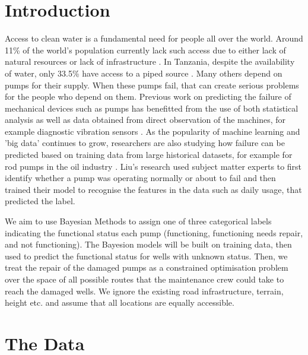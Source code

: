 \documentclass{article} %
\begin{document}
\begin{multicols}{2}

\section{Introduction}

Access to clean water is a fundamental need for people all over the world. Around 11\% of the world's population currently lack such access due to either lack of natural resources or lack of infrastructure \cite{UN2013}. In Tanzania, despite the availability of water, only 33.5\% have access to a piped source \cite{Morisset2012}. Many others depend on pumps for their supply. When these pumps fail, that can create serious problems for the people who depend on them. Previous work on predicting the failure of mechanical devices such as pumps has benefitted from the use of both statistical analysis as well as data obtained from direct observation of the machines, for example diagnostic vibration sensors \cite{Nakamura2007}. As the popularity of machine learning and 'big data' continues to grow, researchers are also studying how failure can be predicted based on training data from large historical datasets, for example for rod pumps in the oil industry \cite{Liu2013}. Liu's research used subject matter experts to first identify whether a pump was operating normally or about to fail and then trained their model to recognise the features in the data such as daily usage, that predicted the label. 

We aim to use Bayesian Methods to assign one of three categorical labels indicating the functional status each pump (functioning, functioning needs repair, and not functioning). The Bayesion models will be built on training data, then used to predict the functional status for wells with unknown status. Then, we treat the repair of the damaged pumps as a constrained optimisation problem over the space of all possible routes that the maintenance crew could take to reach the damaged wells. We ignore the existing road infrastructure, terrain, height etc. and assume that all locations are equally accessible. 

\section{The Data}


\end{multicols}
\end{document}
